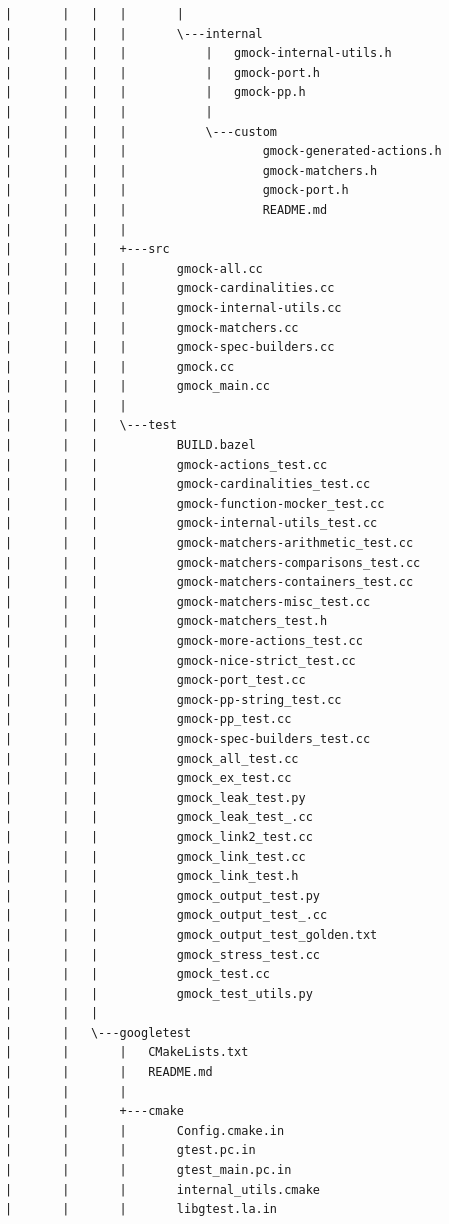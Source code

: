 \documentclass[a4paper,12pt]{article}
\begin{document}
\begin{verbatim}
|       |   |   |       |   
|       |   |   |       \---internal
|       |   |   |           |   gmock-internal-utils.h
|       |   |   |           |   gmock-port.h
|       |   |   |           |   gmock-pp.h
|       |   |   |           |   
|       |   |   |           \---custom
|       |   |   |                   gmock-generated-actions.h
|       |   |   |                   gmock-matchers.h
|       |   |   |                   gmock-port.h
|       |   |   |                   README.md
|       |   |   |                   
|       |   |   +---src
|       |   |   |       gmock-all.cc
|       |   |   |       gmock-cardinalities.cc
|       |   |   |       gmock-internal-utils.cc
|       |   |   |       gmock-matchers.cc
|       |   |   |       gmock-spec-builders.cc
|       |   |   |       gmock.cc
|       |   |   |       gmock_main.cc
|       |   |   |       
|       |   |   \---test
|       |   |           BUILD.bazel
|       |   |           gmock-actions_test.cc
|       |   |           gmock-cardinalities_test.cc
|       |   |           gmock-function-mocker_test.cc
|       |   |           gmock-internal-utils_test.cc
|       |   |           gmock-matchers-arithmetic_test.cc
|       |   |           gmock-matchers-comparisons_test.cc
|       |   |           gmock-matchers-containers_test.cc
|       |   |           gmock-matchers-misc_test.cc
|       |   |           gmock-matchers_test.h
|       |   |           gmock-more-actions_test.cc
|       |   |           gmock-nice-strict_test.cc
|       |   |           gmock-port_test.cc
|       |   |           gmock-pp-string_test.cc
|       |   |           gmock-pp_test.cc
|       |   |           gmock-spec-builders_test.cc
|       |   |           gmock_all_test.cc
|       |   |           gmock_ex_test.cc
|       |   |           gmock_leak_test.py
|       |   |           gmock_leak_test_.cc
|       |   |           gmock_link2_test.cc
|       |   |           gmock_link_test.cc
|       |   |           gmock_link_test.h
|       |   |           gmock_output_test.py
|       |   |           gmock_output_test_.cc
|       |   |           gmock_output_test_golden.txt
|       |   |           gmock_stress_test.cc
|       |   |           gmock_test.cc
|       |   |           gmock_test_utils.py
|       |   |           
|       |   \---googletest
|       |       |   CMakeLists.txt
|       |       |   README.md
|       |       |   
|       |       +---cmake
|       |       |       Config.cmake.in
|       |       |       gtest.pc.in
|       |       |       gtest_main.pc.in
|       |       |       internal_utils.cmake
|       |       |       libgtest.la.in

\end{verbatim}
\end{document}
